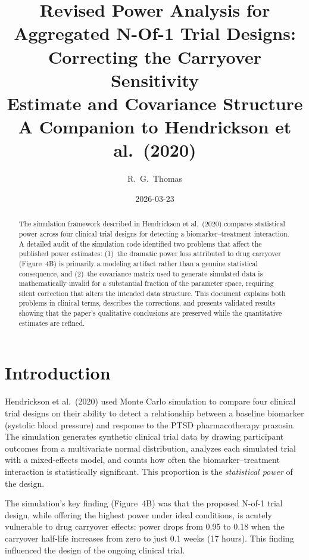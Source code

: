\documentclass[11pt]{article}
\title{Revised Power Analysis for\\
       Aggregated N-Of-1 Trial Designs:\\
       Correcting the Carryover Sensitivity\\
       Estimate and Covariance Structure\\[6pt]
       \large A Companion to Hendrickson et al.\ (2020)}
\author{R.\ G.\ Thomas}
\date{2026-03-23}
\begin{document}
\maketitle
\thispagestyle{fancy}

\begin{abstract}
The simulation framework described in Hendrickson et al.\
(2020) compares statistical power across four clinical trial
designs for detecting a biomarker--treatment interaction. A
detailed audit of the simulation code identified two problems
that affect the published power estimates: (1)~the dramatic
power loss attributed to drug carryover (Figure~4B) is
primarily a modeling artifact rather than a genuine
statistical consequence, and (2)~the covariance matrix used
to generate simulated data is mathematically invalid for a
substantial fraction of the parameter space, requiring silent
correction that alters the intended data structure. This
document explains both problems in clinical terms, describes
the corrections, and presents validated results showing that
the paper's qualitative conclusions are preserved while the
quantitative estimates are refined.
\end{abstract}

\tableofcontents
\newpage

\section{Introduction}

Hendrickson et al.\ (2020) used Monte Carlo simulation to
compare four clinical trial designs on their ability to detect
a relationship between a baseline biomarker (systolic blood
pressure) and response to the PTSD pharmacotherapy prazosin.
The simulation generates synthetic clinical trial data by
drawing participant outcomes from a multivariate normal
distribution, analyzes each simulated trial with a mixed-effects
model, and counts how often the biomarker--treatment interaction
is statistically significant. This proportion is the
\emph{statistical power} of the design.

The simulation's key finding (Figure~4B) was that the proposed
N-of-1 trial design, while offering the highest power under
ideal conditions, is acutely vulnerable to drug carryover
effects: power drops from 0.95 to 0.18 when the carryover
half-life increases from zero to just 0.1 weeks (17 hours).
This finding influenced the design of the ongoing clinical
trial.
\end{document}
